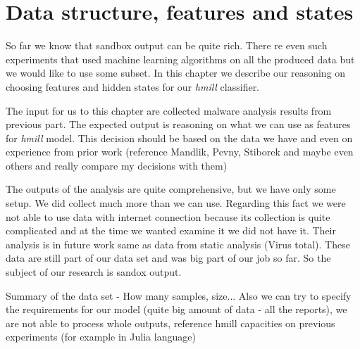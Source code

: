 \chapter{Data structure, features and states} \label{chap:data}
So far we know that sandbox output can be quite rich. There re even such experiments that used machine learning algorithms on all the produced data but we would like to use some subset. In this chapter we describe our reasoning on choosing features and hidden states for our \emph{hmill} classifier.

The input for us to this chapter are collected malware analysis results from previous part. The expected output is reasoning on what we can use as features for \emph{hmill} model. This decision should be based on the data we have and even on experience from prior work (reference Mandlik, Pevny, Stiborek and maybe even others and really compare my decisions with them)

The outputs of the analysis are quite comprehensive, but we have only some setup. We did collect much more than we can use. Regarding this fact we were not able to use data with internet connection because its collection is quite complicated and at the time we wanted examine it we did not have it. Their analysis is in future work same as data from static analysis (Virus total). These data are still part of our data set and was big part of our job so far. So the subject of our research is sandox output.

Summary of the data set - How many samples, size...
Also we can try to specify the requirements for our model (quite big amount of data - all the reports), we are not able to process whole outputs, reference hmill capacities on previous experiments (for example in Julia language)


